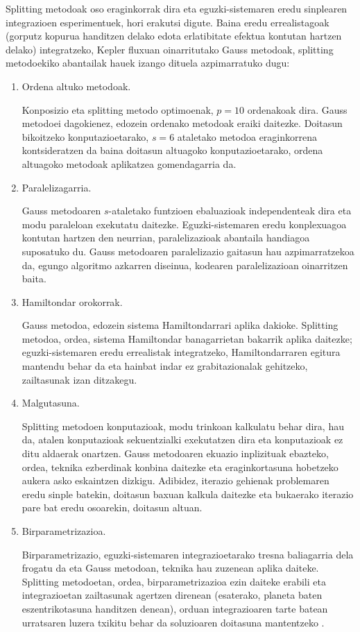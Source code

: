 Splitting metodoak oso eraginkorrak dira eta eguzki-sistemaren eredu sinplearen integrazioen  esperimentuek, hori erakutsi digute. Baina eredu errealistagoak (gorputz kopurua handitzen delako edota erlatibitate efektua kontutan hartzen delako) integratzeko, Kepler fluxuan oinarritutako Gauss metodoak, splitting metodoekiko abantailak hauek izango dituela azpimarratuko dugu:  

\begin{enumerate}

\item Ordena altuko metodoak.

Konposizio eta  splitting metodo optimoenak, $p=10$ ordenakoak dira. Gauss metodoei dagokienez, edozein ordenako metodoak eraiki daitezke. Doitasun bikoitzeko konputazioetarako, $s=6$ ataletako metodoa eraginkorrena kontsideratzen da \cite{Hairer2008} baina doitasun altuagoko konputazioetarako, ordena altuagoko metodoak aplikatzea gomendagarria da.

\item Paralelizagarria.

Gauss metodoaren $s$-ataletako funtzioen ebaluazioak independenteak dira eta modu paraleloan exekutatu daitezke. Eguzki-sistemaren eredu konplexuagoa kontutan hartzen den neurrian, paralelizazioak abantaila handiagoa suposatuko du. Gauss metodoaren paralelizazio gaitasun hau azpimarratzekoa da, egungo algoritmo azkarren diseinua, kodearen paralelizazioan oinarritzen baita.

\item Hamiltondar orokorrak.

Gauss metodoa, edozein sistema Hamiltondarrari aplika dakioke. Splitting metodoa, ordea, sistema Hamiltondar banagarrietan bakarrik aplika daitezke; eguzki-sistemaren eredu errealistak integratzeko, Hamiltondarraren egitura mantendu behar da eta hainbat indar ez grabitazionalak  gehitzeko, zailtasunak izan ditzakegu. 

\item Malgutasuna.

Splitting metodoen konputazioak, modu trinkoan kalkulatu behar dira, hau da, atalen konputazioak sekuentzialki exekutatzen dira eta konputazioak ez ditu aldaerak onartzen. Gauss metodoaren ekuazio inplizituak ebazteko, ordea, teknika ezberdinak konbina daitezke eta eraginkortasuna hobetzeko aukera asko eskaintzen dizkigu. Adibidez, iterazio gehienak problemaren eredu sinple batekin, doitasun baxuan kalkula daitezke  \cite{Beylkin2014} eta bukaerako iterazio pare bat eredu osoarekin, doitasun altuan. 

\item Birparametrizazioa.

Birparametrizazio, eguzki-sistemaren integrazioetarako tresna baliagarria dela frogatu da \cite{Fukushima2007,Rauch1998} eta Gauss metodoan,  teknika hau zuzenean aplika daiteke. Splitting metodoetan, ordea, birparametrizazioa ezin daiteke erabili eta integrazioetan zailtasunak agertzen direnean (esaterako, planeta baten eszentrikotasuna handitzen denean), orduan integrazioaren tarte batean urratsaren luzera txikitu behar da soluzioaren doitasuna mantentzeko \cite{Laskar2009}.

\end{enumerate}


